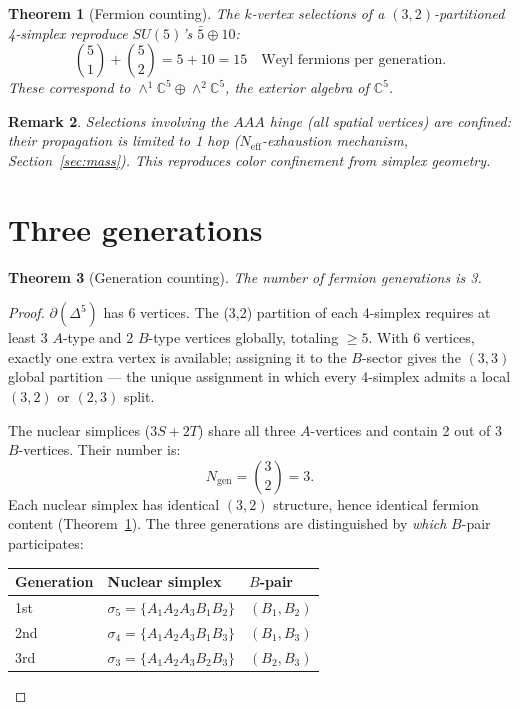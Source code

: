 \documentclass[12pt,a4paper]{article}
\newtheorem{theorem}{Theorem}[section]
\newtheorem{remark}[theorem]{Remark}
\newcommand{\CC}{\mathbb{C}}
\begin{document}
\begin{theorem}[Fermion counting]
\label{thm:fermion}
The $k$-vertex selections of a $(3,2)$-partitioned 4-simplex
reproduce $SU(5)$'s $\bar{5} \oplus 10$:
\begin{equation}
\binom{5}{1} + \binom{5}{2} = 5 + 10 = 15
\quad \text{Weyl fermions per generation.}
\end{equation}
These correspond to $\wedge^1\CC^5 \oplus \wedge^2\CC^5$,
the exterior algebra of $\CC^5$.
\end{theorem}

\begin{remark}
Selections involving the $AAA$ hinge (all spatial vertices)
are confined: their propagation is limited to 1 hop
($N_{\mathrm{eff}}$-exhaustion mechanism, Section~\ref{sec:mass}).
This reproduces color confinement from simplex geometry.
\end{remark}

\section{Three generations}
\label{sec:gen}

\begin{theorem}[Generation counting]
\label{thm:gen}
The number of fermion generations is 3.
\end{theorem}

\begin{proof}
$\partial(\Delta^5)$ has 6 vertices.
The (3,2) partition of each 4-simplex requires at least 3
$A$-type and 2 $B$-type vertices globally, totaling $\geq 5$.
With 6 vertices, exactly one extra vertex is available; assigning
it to the $B$-sector gives the $(3,3)$ global partition ---
the unique assignment in which every 4-simplex admits a local
$(3,2)$ or $(2,3)$ split.

The nuclear simplices ($3S+2T$)
share all three $A$-vertices and contain 2 out of 3 $B$-vertices.
Their number is:
\begin{equation}
N_{\mathrm{gen}} = \binom{3}{2} = 3.
\end{equation}
Each nuclear simplex has identical $(3,2)$ structure, hence
identical fermion content (Theorem~\ref{thm:fermion}).
The three generations are distinguished by \emph{which}
$B$-pair participates:
\begin{center}
\begin{tabular}{lll}
\toprule
Generation & Nuclear simplex & $B$-pair \\
\midrule
1st & $\sigma_5 = \{A_1A_2A_3B_1B_2\}$ & $(B_1,B_2)$ \\
2nd & $\sigma_4 = \{A_1A_2A_3B_1B_3\}$ & $(B_1,B_3)$ \\
3rd & $\sigma_3 = \{A_1A_2A_3B_2B_3\}$ & $(B_2,B_3)$ \\
\bottomrule
\end{tabular}
\end{center}
\end{proof}
\end{document}

